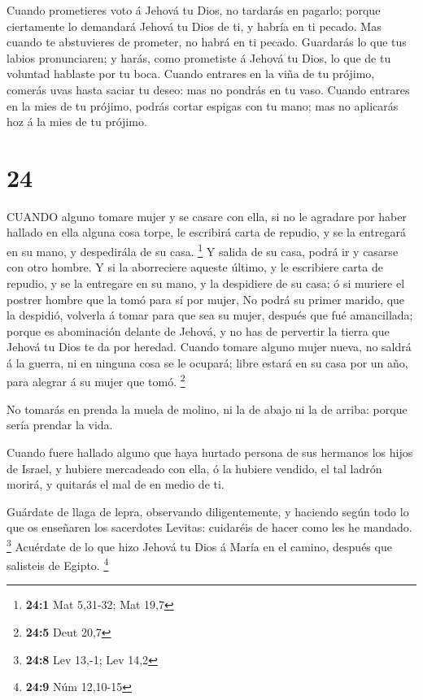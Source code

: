  Cuando prometieres voto á Jehová tu Dios, no tardarás en
pagarlo; porque ciertamente lo demandará Jehová tu Dios de ti, y habría
en ti pecado.  Mas cuando te abstuvieres de prometer, no
habrá en ti pecado.  Guardarás lo que tus labios
pronunciaren; y harás, como prometiste á Jehová tu Dios, lo que de tu
voluntad hablaste por tu boca.  Cuando entrares en la viña
de tu prójimo, comerás uvas hasta saciar tu deseo: mas no pondrás en tu
vaso.  Cuando entrares en la mies de tu prójimo, podrás
cortar espigas con tu mano; mas no aplicarás hoz á la mies de tu
prójimo.

\hypertarget{section-23}{%
\section{24}\label{section-23}}

 CUANDO alguno tomare mujer y se casare con ella, si no le
agradare por haber hallado en ella alguna cosa torpe, le escribirá carta
de repudio, y se la entregará en su mano, y despedirála de su casa.
\footnote{\textbf{24:1} Mat 5,31-32; Mat 19,7}  Y salida de
su casa, podrá ir y casarse con otro hombre.  Y si la
aborreciere aqueste último, y le escribiere carta de repudio, y se la
entregare en su mano, y la despidiere de su casa; ó si muriere el
postrer hombre que la tomó para sí por mujer,  No podrá su
primer marido, que la despidió, volverla á tomar para que sea su mujer,
después que fué amancillada; porque es abominación delante de Jehová, y
no has de pervertir la tierra que Jehová tu Dios te da por heredad.
 Cuando tomare alguno mujer nueva, no saldrá á la guerra, ni
en ninguna cosa se le ocupará; libre estará en su casa por un año, para
alegrar á su mujer que tomó. \footnote{\textbf{24:5} Deut 20,7}

 No tomarás en prenda la muela de molino, ni la de abajo ni
la de arriba: porque sería prendar la vida.

 Cuando fuere hallado alguno que haya hurtado persona de sus
hermanos los hijos de Israel, y hubiere mercadeado con ella, ó la
hubiere vendido, el tal ladrón morirá, y quitarás el mal de en medio de
ti.

 Guárdate de llaga de lepra, observando diligentemente, y
haciendo según todo lo que os enseñaren los sacerdotes Levitas:
cuidaréis de hacer como les he mandado. \footnote{\textbf{24:8} Lev
  13,-1; Lev 14,2}  Acuérdate de lo que hizo Jehová tu Dios
á María en el camino, después que salisteis de Egipto. \footnote{\textbf{24:9}
  Núm 12,10-15}

